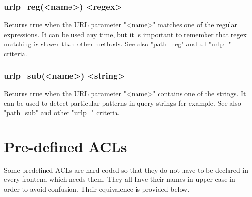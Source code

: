 \subsubsection[urlp\_reg]{urlp\_reg(<name>) <regex>}
  Returns true when the URL parameter "<name>" matches one of the regular
  expressions. It can be used any time, but it is important to remember that
  regex matching is slower than other methods. See also "path\_reg" and all
  "urlp\_" criteria.

\subsubsection[urlp\_sub]{urlp\_sub(<name>) <string>}
  Returns true when the URL parameter "<name>" contains one of the strings. It
  can be used to detect particular patterns in query strings for example. See
  also "path\_sub" and other "urlp\_" criteria.

\section{Pre-defined ACLs}

Some predefined ACLs are hard-coded so that they do not have to be declared in
every frontend which needs them. They all have their names in upper case in
order to avoid confusion. Their equivalence is provided below.

